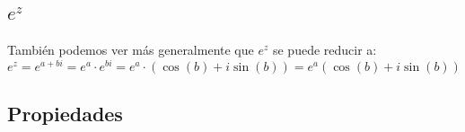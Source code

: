 \documentclass[12pt, fleqn]{report}                             %
\theoremstyle{break}                                            %
\newcommand{\Wrap}[1]           {\left( #1 \right)}             %
\newcommand{\Cos}[1] {\cos\Wrap{#1}}                            %
\newcommand{\Sin}[1] {\sin\Wrap{#1}}                            %
\newcommand \Cis[1]  {\Cos{#1} + i \Sin{#1}}                    %
\newcommand \pCis[1] {\Wrap{\Cis{#1}}}                          %
\begin{document}
            \subsection{$e^z$}

                También podemos ver más generalmente que $e^z$ se puede reducir a:
                \begin{equation*}
                    e^z = e^{a+bi} = e^a \cdot e^{bi} = e^a \cdot \pCis{b} = e^a \pCis{b}
                \end{equation*}

        
            \clearpage
            \subsection{Propiedades}
\end{document}
